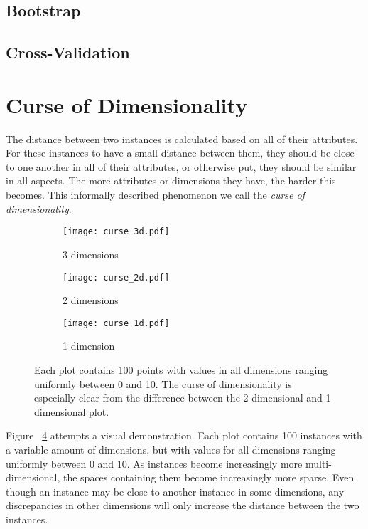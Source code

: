 \subsection{Bootstrap}

\subsection{Cross-Validation}

\section{Curse of Dimensionality}
The distance between two instances is calculated based on all of their attributes.
For these instances to have a small distance between them,
they should be close to one another in all of their attributes,
or otherwise put,
they should be similar in all aspects.
The more attributes or dimensions they have,
the harder this becomes.
This informally described phenomenon we call
the \textit{curse of dimensionality}.

\begin{figure}[ht]
\center

\begin{subfigure}{.49\textwidth}
  \centering
  \texttt{[image: curse\_3d.pdf]}
  \caption{3 dimensions}
  \label{fig.ml.cod3}
\end{subfigure}
\begin{subfigure}{.49\textwidth}
  \centering
  \texttt{[image: curse\_2d.pdf]}
  \caption{2 dimensions}
  \label{fig.ml.cod2}
\end{subfigure}
\begin{subfigure}{.45\textwidth}
  \centering
  \texttt{[image: curse\_1d.pdf]}
  \caption{1 dimension}
  \label{fig.ml.cod1}
\end{subfigure}

\caption{Each plot contains 100 points
with values in all dimensions ranging
uniformly between 0 and 10.
The curse of dimensionality is especially clear
from the difference between the 2-dimensional
and 1-dimensional plot.
}
\label{fig.ml.cod}
\end{figure}

Figure ~\ref{fig.ml.cod} attempts a visual demonstration.
Each plot contains 100 instances with a variable amount of dimensions,
but with values for all dimensions ranging uniformly between 0 and 10.
As instances become increasingly more multi-dimensional, %
the spaces containing them become increasingly more sparse.
Even though an instance may be close to another instance
in some dimensions,
any discrepancies in other dimensions
will only increase the distance between the two instances.

